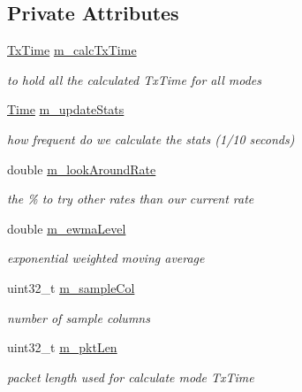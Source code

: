 \subsection*{Private Attributes}
\begin{DoxyCompactItemize}
\item 
\hyperlink{classns3_1_1MinstrelWifiManager_a6130b5465b4427d329230812377e661c}{Tx\+Time} \hyperlink{classns3_1_1MinstrelWifiManager_a65d70d759a8699f6221159d4cdfee415}{m\+\_\+calc\+Tx\+Time}
\begin{DoxyCompactList}\small\item\em to hold all the calculated Tx\+Time for all modes \end{DoxyCompactList}\item 
\hyperlink{classns3_1_1Time}{Time} \hyperlink{classns3_1_1MinstrelWifiManager_abd6d6339afd6875826c0ffa11297ad65}{m\+\_\+update\+Stats}
\begin{DoxyCompactList}\small\item\em how frequent do we calculate the stats (1/10 seconds) \end{DoxyCompactList}\item 
double \hyperlink{classns3_1_1MinstrelWifiManager_aebf6e38fb43af62f59490829d46e0e1d}{m\+\_\+look\+Around\+Rate}
\begin{DoxyCompactList}\small\item\em the \% to try other rates than our current rate \end{DoxyCompactList}\item 
double \hyperlink{classns3_1_1MinstrelWifiManager_a528f4990b2e92f3b38ee1a4f764f0166}{m\+\_\+ewma\+Level}
\begin{DoxyCompactList}\small\item\em exponential weighted moving average \end{DoxyCompactList}\item 
uint32\+\_\+t \hyperlink{classns3_1_1MinstrelWifiManager_a2112a731d89b8cd936a7f659aa678a15}{m\+\_\+sample\+Col}
\begin{DoxyCompactList}\small\item\em number of sample columns \end{DoxyCompactList}\item 
uint32\+\_\+t \hyperlink{classns3_1_1MinstrelWifiManager_a425848a251a8fc4db5d9acb2d8c21538}{m\+\_\+pkt\+Len}
\begin{DoxyCompactList}\small\item\em packet length used for calculate mode Tx\+Time \end{DoxyCompactList}\item 

\end{DoxyCompactItemize}
